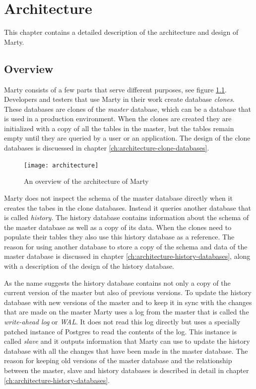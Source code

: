 \chapter{Architecture}
This chapter contains a detailed description of the architecture and design of Marty.

\section{Overview}
Marty consists of a few parts that serve different purposes, see figure \ref{fig:architecture-overview}.
Developers and testers that use Marty in their work create database \textit{clones}.
These databases are clones of the \textit{master} database, which can be a database that is used in a production environment.
When the clones are created they are initialized with a copy of all the tables in the master, but the tables remain empty until they are queried by a user or an application.
The design of the clone databases is discuessed in chapter \ref{ch:architecture-clone-databases}.

\begin{figure}[h!]
  \centering
    \texttt{[image: architecture]}
  \caption{An overview of the architecture of Marty}
  \label{fig:architecture-overview}
\end{figure}

Marty does not inspect the schema of the master database directly when it creates the tabes in the clone databases.
Instead it queries another database that is called \textit{history}.
The history database contains information about the schema of the master database as well as a copy of its data.
When the clones need to populate their tables they also use this history database as a reference.
The reason for using another database to store a copy of the schema and data of the master database is discussed in chapter \ref{ch:architecture-history-databases}, along with a description of the design of the history database.

As the name suggests the history database contains not only a copy of the current version of the master but also of previous versions.
To update the history database with new versions of the master and to keep it in sync with the changes that are made on the master Marty uses a log from the master that is called the \textit{write-ahead log} or \textit{WAL}.
It does not read this log directly but uses a specially patched instance of Postgres to read the contents of the log.
This instance is called \textit{slave} and it outputs information that Marty can use to update the history database with all the changes that have been made in the master database.
The reason for keeping old versions of the master database and the relationship between the master, slave and history databases is described in detail in chapter \ref{ch:architecture-history-databases}.

